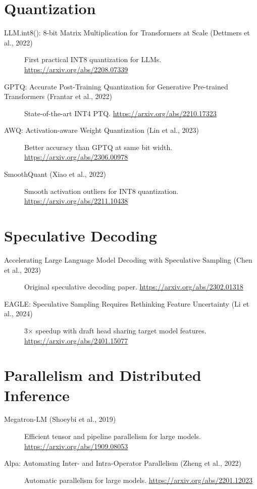 \documentclass[11pt, twoside, openright]{book}
\begin{document}
\section*{Quantization}

\begin{description}
  \item[LLM.int8(): 8-bit Matrix Multiplication for Transformers at Scale
    (Dettmers et al., 2022)]
    First practical INT8 quantization for LLMs.
    \url{https://arxiv.org/abs/2208.07339}

  \item[GPTQ: Accurate Post-Training Quantization for Generative Pre-trained
    Transformers (Frantar et al., 2022)]
    State-of-the-art INT4 PTQ.
    \url{https://arxiv.org/abs/2210.17323}

  \item[AWQ: Activation-aware Weight Quantization (Lin et al., 2023)]
    Better accuracy than GPTQ at same bit width.
    \url{https://arxiv.org/abs/2306.00978}

  \item[SmoothQuant (Xiao et al., 2022)]
    Smooth activation outliers for INT8 quantization.
    \url{https://arxiv.org/abs/2211.10438}
\end{description}

\section*{Speculative Decoding}

\begin{description}
  \item[Accelerating Large Language Model Decoding with Speculative Sampling
    (Chen et al., 2023)]
    Original speculative decoding paper.
    \url{https://arxiv.org/abs/2302.01318}

  \item[EAGLE: Speculative Sampling Requires Rethinking Feature Uncertainty
    (Li et al., 2024)]
    3$\times$ speedup with draft head sharing target model features.
    \url{https://arxiv.org/abs/2401.15077}
\end{description}

\section*{Parallelism and Distributed Inference}

\begin{description}
  \item[Megatron-LM (Shoeybi et al., 2019)]
    Efficient tensor and pipeline parallelism for large models.
    \url{https://arxiv.org/abs/1909.08053}

  \item[Alpa: Automating Inter- and Intra-Operator Parallelism (Zheng et al., 2022)]
    Automatic parallelism for large models.
    \url{https://arxiv.org/abs/2201.12023}
\end{description}
\end{document}
